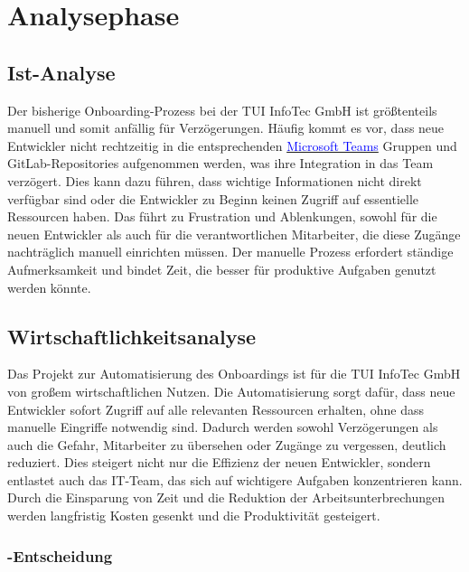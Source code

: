 
\section{Analysephase}
\label{sec:Analysephase}

\subsection{Ist-Analyse}
\label{sec:IstAnalyse}

Der bisherige Onboarding-Prozess bei der \ac{TUI} InfoTec GmbH ist größtenteils manuell und somit anfällig für Verzögerungen. Häufig kommt es vor, dass neue Entwickler nicht rechtzeitig in die entsprechenden \hyperlink{MicrosoftTeams}{\textcolor{blue}{Microsoft Teams}} Gruppen und GitLab-Repositories aufgenommen werden, was ihre Integration in das Team verzögert. Dies kann dazu führen, dass wichtige Informationen nicht direkt verfügbar sind oder die Entwickler zu Beginn keinen Zugriff auf essentielle Ressourcen haben. Das führt zu Frustration und Ablenkungen, sowohl für die neuen Entwickler als auch für die verantwortlichen Mitarbeiter, die diese Zugänge nachträglich manuell einrichten müssen. Der manuelle Prozess erfordert ständige Aufmerksamkeit und bindet Zeit, die besser für produktive Aufgaben genutzt werden könnte.

\subsection{Wirtschaftlichkeitsanalyse}
\label{sec:Wirtschaftlichkeitsanalyse}

Das Projekt zur Automatisierung des Onboardings ist für die \ac{TUI} InfoTec GmbH von großem wirtschaftlichen Nutzen. Die Automatisierung sorgt dafür, dass neue Entwickler sofort Zugriff auf alle relevanten Ressourcen erhalten, ohne dass manuelle Eingriffe notwendig sind. Dadurch werden sowohl Verzögerungen als auch die Gefahr, Mitarbeiter zu übersehen oder Zugänge zu vergessen, deutlich reduziert. Dies steigert nicht nur die Effizienz der neuen Entwickler, sondern entlastet auch das IT-Team, das sich auf wichtigere Aufgaben konzentrieren kann. Durch die Einsparung von Zeit und die Reduktion der Arbeitsunterbrechungen werden langfristig Kosten gesenkt und die Produktivität gesteigert.

\subsubsection{-Entscheidung}
\label{sec:MakeOrBuyEntscheidung}

